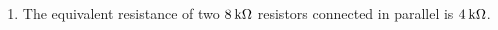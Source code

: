 {\begin{mdframed}[linewidth=4, leftmargin=40, rightmargin=40]
\begin{exercise}
\begin{enumerate}[noitemsep, label=\textbf{Step} \textbf{\arabic*}. ]
          
          \item  
          \label{m38776*id650261}The equivalent resistance of two \begin{math}8\phantom{\rule{2pt}{0ex}}\mathrm{k}\Omega \end{math} resistors connected in parallel is \begin{math}4\phantom{\rule{2pt}{0ex}}\mathrm{k}\Omega \end{math}. \par 
          \end{enumerate}
         

    \end{exercise}
    \end{mdframed}
    }
    \noindent
  \label{m38776*eip-994}\vspace{.5cm} 
     \vspace{\rubberspace} 
     \vspace{\rubberspace}
